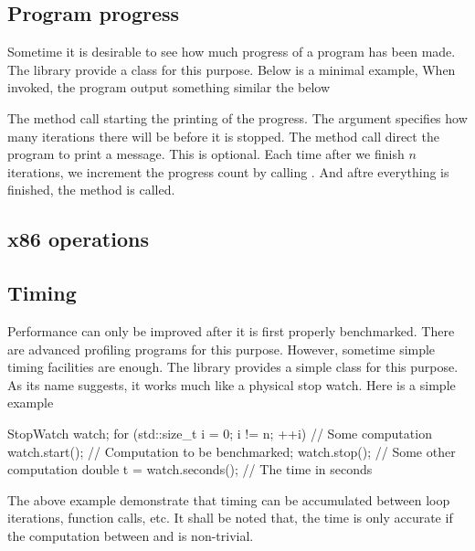 \documentclass[11pt,bib,mint,hyper,altcolor]{marticle}
\begin{document}
\subsection{Program progress}
\label{sub:Program progress}

Sometime it is desirable to see how much progress of a program has been made.
The library provide a  class for this purpose. Below is a
minimal example,
When invoked, the program output something similar the below
The method call  starting the printing of the
progress. The argument specifies how many iterations there will be before it is
stopped. The method call  direct the
program to print a message. This is optional. Each time after we finish $n$
iterations, we increment the progress count by calling
. And aftre everything is finished, the method
 is called.

\subsection{x86 \protect\simd operations}
\label{sub:x86 SIMD operations}

\subsection{Timing}
\label{sub:Timing}

Performance can only be improved after it is first properly benchmarked. There
are advanced profiling programs for this purpose. However, sometime simple
timing facilities are enough. The library provides a simple class
 for this purpose. As its name suggests, it works much
like a physical stop watch. Here is a simple example
\begin{cppcode}
  StopWatch watch;
  for (std::size_t i = 0; i != n; ++i) {
      // Some computation
      watch.start();
      // Computation to be benchmarked;
      watch.stop();
      // Some other computation
  }
  double t = watch.seconds(); // The time in seconds
\end{cppcode}
The above example demonstrate that timing can be accumulated between loop
iterations, function calls, etc. It shall be noted that, the time is only
accurate if the computation between  and
 is non-trivial.

\printbibliography[title=\refname]
\end{document}
